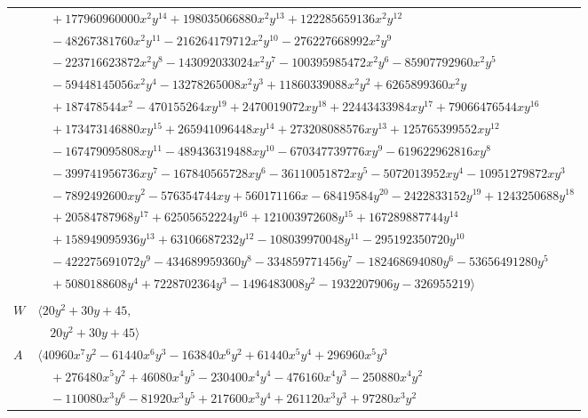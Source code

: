 \documentclass[11pt]{article}
\begin{document}
\begin{longtable}{@{}ll@{}}
 & $\quad +177960960000x^{2}y^{14}+198035066880x^{2}y^{13}+122285659136x^{2}y^{12}$\\
 & $\quad -48267381760x^{2}y^{11}-216264179712x^{2}y^{10}-276227668992x^{2}y^{9}$\\
 & $\quad -223716623872x^{2}y^{8}-143092033024x^{2}y^{7}-100395985472x^{2}y^{6}-85907792960x^{2}y^{5}$\\
 & $\quad -59448145056x^{2}y^{4}-13278265008x^{2}y^{3}+11860339088x^{2}y^{2}+6265899360x^{2}y$\\
 & $\quad +187478544x^{2}-470155264xy^{19}+2470019072xy^{18}+22443433984xy^{17}+79066476544xy^{16}$\\
 & $\quad +173473146880xy^{15}+265941096448xy^{14}+273208088576xy^{13}+125765399552xy^{12}$\\
 & $\quad -167479095808xy^{11}-489436319488xy^{10}-670347739776xy^{9}-619622962816xy^{8}$\\
 & $\quad -399741956736xy^{7}-167840565728xy^{6}-36110051872xy^{5}-5072013952xy^{4}-10951279872xy^{3}$\\
 & $\quad -7892492600xy^{2}-576354744xy+560171166x-68419584y^{20}-2422833152y^{19}+1243250688y^{18}$\\
 & $\quad +20584787968y^{17}+62505652224y^{16}+121003972608y^{15}+167289887744y^{14}$\\
 & $\quad +158949095936y^{13}+63106687232y^{12}-108039970048y^{11}-295192350720y^{10}$\\
 & $\quad -422275691072y^{9}-434689959360y^{8}-334859771456y^{7}-182468694080y^{6}-53656491280y^{5}$\\
 & $\quad +5080188608y^{4}+7228702364y^{3}-1496483008y^{2}-1932207906y-326955219\rangle$\\
\addlinespace[2pt]
\multicolumn{2}{@{}p{0.97\textwidth}@{}}{$i=44$, $D_i=8$, $\rho_{ij}$: $0{:}2, \allowbreak 10{:}1, \allowbreak 28{:}1, \allowbreak 36{:}1, \allowbreak 39{:}1, \allowbreak 40{:}2, \allowbreak 41{:}1, \allowbreak 50{:}1, \allowbreak 51{:}2, \allowbreak 60{:}1$}\\
$W$ & $\langle 20y^{2}+30y+45,$\\
 & $\quad 20y^{2}+30y+45\rangle$\\
$A$ & $\langle 40960x^{7}y^{2}-61440x^{6}y^{3}-163840x^{6}y^{2}+61440x^{5}y^{4}+296960x^{5}y^{3}$\\
 & $\quad +276480x^{5}y^{2}+46080x^{4}y^{5}-230400x^{4}y^{4}-476160x^{4}y^{3}-250880x^{4}y^{2}$\\
 & $\quad -110080x^{3}y^{6}-81920x^{3}y^{5}+217600x^{3}y^{4}+261120x^{3}y^{3}+97280x^{3}y^{2}$\\

\end{longtable}
\end{document}
